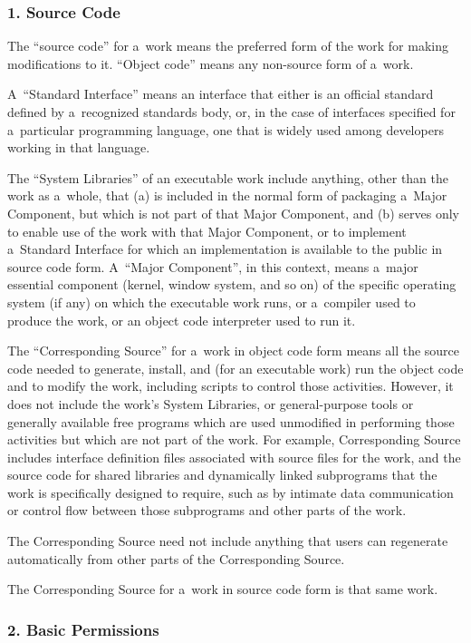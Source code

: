 \documentclass[a4paper, 11pt, twoside]{article}
\begin{document}
\subsubsection{1. Source Code}

The “source code” for a~work means the preferred form of the work for making modifications to it. “Object code” means any non-source form of a~work.

A~“Standard Interface” means an interface that either is an official standard defined by a~recognized standards body, or, in the case of interfaces specified for a~particular programming language, one that is widely used among developers working in that language.

The “System Libraries” of an executable work include anything, other than the work as a~whole, that (a) is included in the normal form of packaging a~Major Component, but which is not part of that Major Component, and (b) serves only to enable use of the work with that Major Component, or to implement a~Standard Interface for which an implementation is available to the public in source code form. A~“Major Component”, in this context, means a~major essential component (kernel, window system, and so on) of the specific operating system (if any) on which the executable work runs, or a~compiler used to produce the work, or an object code interpreter used to run it.

The “Corresponding Source” for a~work in object code form means all the source code needed to generate, install, and (for an executable work) run the object code and to modify the work, including scripts to control those activities. However, it does not include the work's System Libraries, or general-purpose tools or generally available free programs which are used unmodified in performing those activities but which are not part of the work. For example, Corresponding Source includes interface definition files associated with source files for the work, and the source code for shared libraries and dynamically linked subprograms that the work is specifically designed to require, such as by intimate data communication or control flow between those subprograms and other parts of the work.

The Corresponding Source need not include anything that users can regenerate automatically from other parts of the Corresponding Source.

The Corresponding Source for a~work in source code form is that same work.

\subsubsection{2. Basic Permissions}
\end{document}
